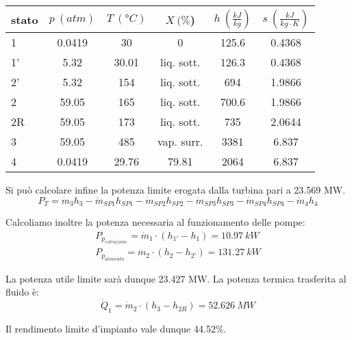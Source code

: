 \begin{center}
    \begin{tabular}{l|c|c|c|c|c}
        stato    & $p\ (atm)$ & $T\ (\text{°}C) $&$X\ (\%$)& $h\ (\frac{kJ}{kg})$  & $s\ (\frac{kJ}{kg\cdot K})$\\ \hline
        1   &        0.0419 &            30   &    0      & 125.6    &0.4368 \\ \hline     %
        1'  &        5.32    &           30.01   &liq. sott.  & 126.3&0.4368 \\ \hline      %
        2'  &          5.32  &         154&liq. sott.           &694&1.9866  \\ \hline      %
        2   &          59.05&           165&liq. sott.      &700.6& 1.9866   \\ \hline      %
        2R  &       59.05   &           173     &liq. sott. &  735  & 2.0644 \\ \hline      %
        3   &        59.05  &            485&  vap. surr.    &  3381 &6.837  \\ \hline      %
        4   &        0.0419       &      29.76&     79.81 &    2064  &6.837                %
    \end{tabular}
\end{center}

Si può calcolare infine la potenza limite erogata dalla turbina pari a 23.569 MW.
\begin{equation*}
    P_T = \dot m_3 h_3 - \dot m_{SP1} h_{SP1} - \dot m_{SP2} h_{SP2} - \dot m_{SP3} h_{SP3} -\dot m_{SP4} h_{SP4} - \dot m_{4} h_4
\end{equation*}

Calcoliamo inoltre la potenza necessaria al funzionamento delle pompe:
\begin{align*}
    P_{p_{estrazione}} = \dot m_1 \cdot (h_{1'} - h_1) = 10.97\ kW \\
    P_{p_{alimento}} = \dot m_2 \cdot (h_2 - h_{2'} ) = 131.27\ kW
\end{align*}

La potenza utile limite sarà dunque 23.427 MW.
La potenza termica trasferita al fluido è:
\begin{equation*}
    \dot Q_1 = \dot m_2 \cdot (h_3 - h_{2R}) = 52.626\ MW
\end{equation*}

Il rendimento limite d'impianto vale dunque 44.52\%.

